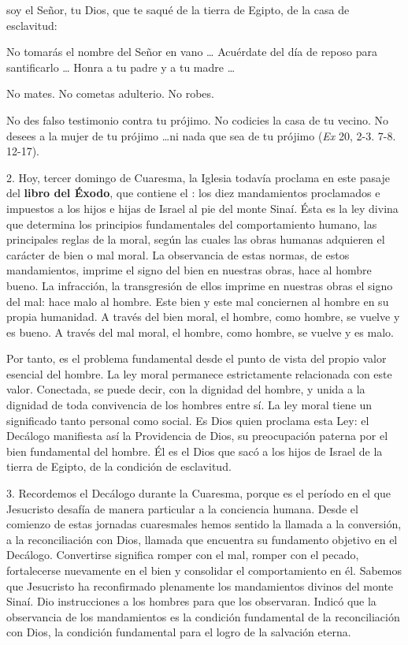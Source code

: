 \begin{body}

 soy el Señor, tu Dios, que te saqué de la tierra de Egipto, de la casa de esclavitud: 

\begin{bodyprose}
No tomarás el nombre del Señor en vano \ldots
   Acuérdate del día de reposo para santificarlo \ldots
   Honra a tu padre y a tu madre \ldots

No mates.
   No cometas adulterio.
   No robes.

No des falso testimonio contra tu prójimo.
   No codicies la casa de tu vecino.
   No desees a la mujer de tu prójimo \ldots ni nada que sea de tu prójimo
(\textit{Ex} 20, 2-3. 7-8. 12-17).
\end{bodyprose}

2. Hoy, tercer domingo de Cuaresma, la Iglesia todavía proclama en este pasaje del \textbf{libro del Éxodo}, que contiene el : los diez mandamientos proclamados e impuestos a los hijos e hijas de Israel al pie del monte Sinaí. Ésta es la ley divina que determina los principios fundamentales del comportamiento humano, las principales reglas de la moral, según las cuales las obras humanas adquieren el carácter de bien o mal moral. La observancia de estas normas, de estos mandamientos, imprime el signo del bien en nuestras obras, hace al hombre bueno. La infracción, la transgresión de ellos imprime en nuestras obras el signo del mal: hace malo al hombre. Este bien y este mal conciernen al hombre en su propia humanidad. A través del bien moral, el hombre, como hombre, se vuelve y es bueno. A través del mal moral, el hombre, como hombre, se vuelve y es malo.

Por tanto, es el problema fundamental desde el punto de vista del propio valor esencial del hombre. La ley moral permanece estrictamente relacionada con este valor. Conectada, se puede decir, con la dignidad del hombre, y unida a la dignidad de toda convivencia de los hombres entre sí. La ley moral tiene un significado tanto personal como social. Es Dios quien proclama esta Ley: el Decálogo manifiesta así la Providencia de Dios, su preocupación paterna por el bien fundamental del hombre. Él es el Dios que sacó a los hijos de Israel de la tierra de Egipto, de la condición de esclavitud.

3. Recordemos el Decálogo durante la Cuaresma, porque es el período en el que Jesucristo desafía de manera particular a la conciencia humana. Desde el comienzo de estas jornadas cuaresmales hemos sentido la llamada a la conversión, a la reconciliación con Dios, llamada que encuentra su fundamento objetivo en el Decálogo. Convertirse significa romper con el mal, romper con el pecado, fortalecerse nuevamente en el bien y consolidar el comportamiento en él. Sabemos que Jesucristo ha reconfirmado plenamente los mandamientos divinos del monte Sinaí. Dio instrucciones a los hombres para que los observaran. Indicó que la observancia de los mandamientos es la condición fundamental de la reconciliación con Dios, la condición fundamental para el logro de la salvación eterna.


\end{body}
